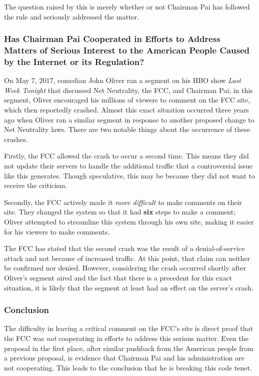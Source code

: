 \documentclass[12pt]{article}
\begin{document}
\begin{multicols}{2}
  The question raised by this is merely whether or not Chairman Pai has followed the rule and seriously addressed the matter.
  
  \subsubsection{Has Chairman Pai Cooperated in Efforts to Address Matters of Serious Interest to the American People Caused by the Internet or its Regulation?}
  On May 7, 2017, comedian John Oliver ran a segment on his HBO show \textit{Last Week Tonight} that discussed Net Neutrality, the FCC, and Chairman Pai; in this segment, Oliver encouraged his millions of viewers to comment on the FCC site, which then reportedly crashed.\cite{oliver} Almost this exact situation occurred three years ago when Oliver ran a similar segment in response to another proposed change to Net Neutrality laws.\cite{oliver2} There are two notable things about the occurrence of these crashes.
  
  Firstly, the FCC allowed the crash to occur a second time. This means they did not update their servers to handle the additional traffic that a controversial issue like this generates. Though speculative, this may be because they did not want to receive the criticism.
  
  Secondly, the FCC actively made it \textit{more difficult} to make comments on their site. They changed the system so that it had \textbf{six} steps to make a comment; Oliver attempted to streamline this system through his own site, making it easier for his viewers to make comments.\cite{oliver2}
  
  The FCC has stated that the second crash was the result of a denial-of-service attack and not because of increased traffic.\cite{oliver, oliver2} At this point, that claim can neither be confirmed nor denied. However, considering the crash occurred shortly after Oliver's segment aired and the fact that there is a precedent for this exact situation, it is likely that the segment at least had an effect on the server's crash.
  
  \subsubsection{Conclusion}
  The difficulty in leaving a critical comment on the FCC's site is direct proof that the FCC was \textit{not} cooperating in efforts to address this serious matter. Even the proposal in the first place, after similar pushback from the American people from a previous proposal, is evidence that Chairman Pai and his administration are not cooperating. This leads to the conclusion that he is breaking this code tenet.
  

\end{multicols}
\end{document}
